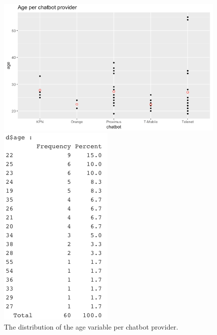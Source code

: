 \begin{figure}[!htb]
	\includegraphics[width=\linewidth]{../LaTeX/Figures/Environments/AgePlot.png}
	\caption{The distribution of the age variable per chatbot provider.}\label{fig:agePlot}
	\endminipage\hfill
	\includegraphics[width=\linewidth]{../LaTeX/Figures/Environments/AgeFreq.png}

\end{figure}
